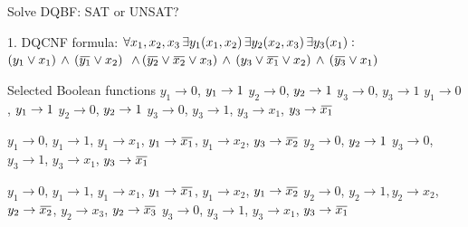 \documentclass[xcolor=table	]{beamer}
\newcommand{\ov}[1]{\mkern 1.5mu\overline{\mkern-1.5mu#1\mkern-1.5mu}\mkern 1.5mu}
\begin{document}
\begin{frame}{Solve DQBF: SAT or UNSAT?}


\begin{alertblock}{1. DQCNF formula:}
	{
		$\forall x_1,x_2,x_3 \, \exists y_1(x_1,x_2) \, \exists y_2(x_2,x_3) \, \exists y_3(x_1) : \newline$
		$(y_{1} \vee x_1) \, \wedge \, (\ov{y_1} \vee x_2)  \newline$ 
		$ \, \wedge \, (\ov{y_2} \vee \ov{x_2} \vee x_3)  \newline \, \wedge \, (y_3 \vee \ov{x_1} \vee x_2) \, \wedge \, (\ov{y_3} \vee x_1)$
		\vspace{0.2cm}
	}
\end{alertblock}

\begin{block}{Selected Boolean functions}
  {
$y_1 \to 0$, $ y_1 \to 1 \newline$
$y_2 \to 0$, $ y_2 \to 1 \newline$
$y_3 \to 0$, $ y_3 \to 1$
}
  {
	$y_1 \to 0$, $ y_1 \to 1 \newline$
	$y_2 \to 0$, $ y_2 \to 1 \newline$
	$y_3 \to 0$, $ y_3 \to 1$, $y_3 \to x_1$, $ y_3 \to \ov{x_1}$ 
}

 {
	$y_1 \to 0$, $ y_1 \to 1$, $y_1 \to x_1$, $ y_1 \to \ov{x_1}$, $y_1 \to x_2$, $ y_3 \to \ov{x_2} \newline$
	$y_2 \to 0$, $ y_2 \to 1 \newline$
	$y_3 \to 0$, $ y_3 \to 1$, $y_3 \to x_1$, $ y_3 \to \ov{x_1}$ 
}

 {
	$y_1 \to 0$, $ y_1 \to 1$, $y_1 \to x_1$, $ y_1 \to \ov{x_1}$, $y_1 \to x_2$, $ y_1 \to \ov{x_2} \newline$
	$y_2 \to 0$, $ y_2 \to 1, y_2 \to x_2$, $ y_2 \to \ov{x_2}$, $y_2 \to x_3$, $ y_2 \to \ov{x_3} \newline$
	$y_3 \to 0$, $ y_3 \to 1$, $y_3 \to x_1$, $ y_3 \to \ov{x_1}$ 
}
\end{block}

\end{frame}
\end{document}

